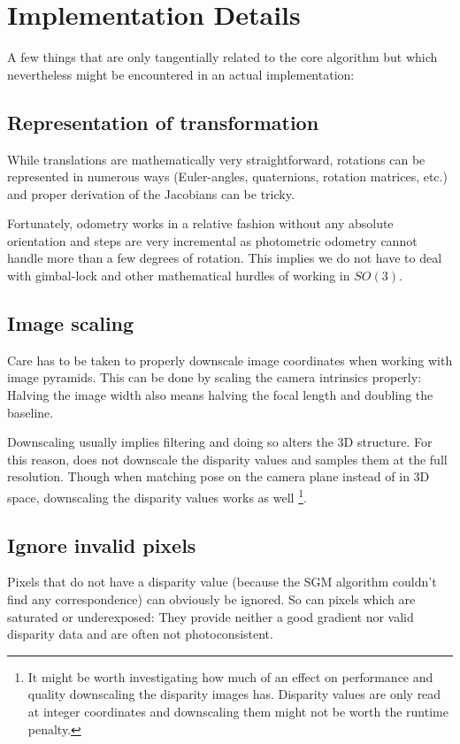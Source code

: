 \chapter{Implementation Details}

A few things that are only tangentially related to the core algorithm but which
nevertheless might be encountered in an actual implementation:

\section{Representation of transformation}

While translations are mathematically very straightforward, rotations can be
represented in numerous ways (Euler-angles, quaternions, rotation matrices,
etc.) and proper derivation of the Jacobians can be tricky.

Fortunately, odometry works in a relative fashion without any absolute
orientation and steps are very incremental as photometric odometry cannot
handle more than a few degrees of rotation. This implies we do not have to deal
with gimbal-lock and other mathematical hurdles of working in $SO(3)$.

\section{Image scaling}

Care has to be taken to properly downscale image coordinates when working with
image pyramids. This can be done by scaling the camera intrinsics properly:
Halving the image width also means halving the focal length and doubling the
baseline.

Downscaling usually implies filtering and doing so alters the 3D structure. For
this reason, \cite{comport2007odometry} does not downscale the disparity values and
samples them at the full resolution. Though when matching pose on the camera plane
instead of in 3D space, downscaling the disparity values works as well
\footnote{It might be worth investigating how much of an effect on performance
and quality downscaling the disparity images has. Disparity values are only
read at integer coordinates and downscaling them might not be worth the runtime
penalty.}.

\section{Ignore invalid pixels}

Pixels that do not have a disparity value (because the SGM algorithm couldn't
find any correspondence) can obviously be ignored. So can pixels which are
saturated or underexposed: They provide neither a good gradient nor valid
disparity data and are often not photoconsistent.

